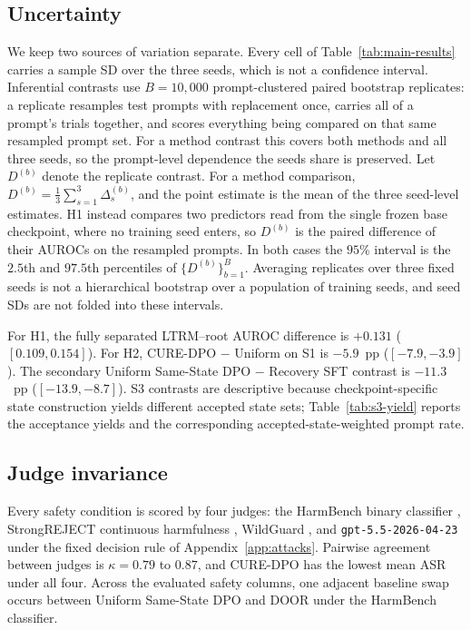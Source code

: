 \documentclass[11pt]{article}
\newcommand{\method}{CURE-DPO}
\newcommand{\ltrm}{LTRM}
\begin{document}
\subsection{Uncertainty}
We keep two sources of variation separate. Every cell of
Table~\ref{tab:main-results} carries a sample SD over the three seeds, which is
not a confidence interval. Inferential contrasts use \(B=10{,}000\)
prompt-clustered paired bootstrap replicates: a replicate resamples test prompts
with replacement once, carries all of a prompt's trials together, and scores
everything being compared on that same resampled prompt set. For a method
contrast this covers both methods and all three seeds, so the prompt-level
dependence the seeds share is preserved. Let \(D^{(b)}\) denote the replicate
contrast. For a method comparison,
\(D^{(b)}=\frac{1}{3}\sum_{s=1}^{3}\Delta^{(b)}_{s}\), and the point estimate is
the mean of the three seed-level estimates. H1 instead compares two predictors
read from the single frozen base checkpoint, where no training seed enters, so
\(D^{(b)}\) is the paired difference of their AUROCs on the resampled prompts.
In both cases the \(95\%\) interval is the \(2.5\)th and \(97.5\)th percentiles
of \(\{D^{(b)}\}_{b=1}^{B}\). Averaging replicates over three fixed seeds is not
a hierarchical bootstrap over a population of training seeds, and seed SDs are
not folded into these intervals.

For H1, the fully separated
\ltrm{}--root AUROC difference is \(+0.131\)
(\([0.109,0.154]\)). For H2, \method{} \(-\) Uniform on S1 is \(-5.9\)~pp
(\([-7.9,-3.9]\)). The secondary Uniform Same-State DPO \(-\) Recovery SFT
contrast is \(-11.3\)~pp (\([-13.9,-8.7]\)). S3 contrasts are descriptive because
checkpoint-specific state construction yields different accepted state sets;
Table~\ref{tab:s3-yield} reports the acceptance yields and the corresponding
accepted-state-weighted prompt rate.

\subsection{Judge invariance}
\label{app:human-evaluation}
Every safety condition is scored by four judges: the HarmBench binary
classifier \citep{mazeika2024harmbench}, StrongREJECT continuous harmfulness
\citep{souly2024strongreject}, WildGuard \citep{han2024wildguard}, and
\texttt{gpt-5.5-2026-04-23} under the fixed decision rule of
Appendix~\ref{app:attacks}. Pairwise agreement between judges is
\(\kappa=0.79\) to \(0.87\), and \method{} has the lowest mean ASR under all
four. Across the evaluated safety columns, one adjacent baseline swap occurs
between Uniform Same-State DPO and DOOR under the HarmBench classifier.
\end{document}

